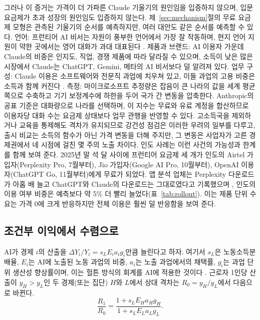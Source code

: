 \documentclass[11pt]{article}
\theoremstyle{definition}
\theoremstyle{remark}
\begin{document}
그러나 이 증거는 가격이 더 가파른 Claude 기울기의 원인임을 입증하지 않으며, 입문 요금제가 초과 성장의 원인임도 입증하지 않는다. 제~\ref{sec:mechanism}절의 무료 요금제 모형은 관측된 기울기의 순서를 예측하지만, 여러 대안도 같은 순서를 예측할 수 있다. 언어: 프런티어 AI 비서는 자원이 풍부한 언어에서 가장 잘 작동하며, 현지 언어 지원이 약한 곳에서는 영어 대화가 과대 대표된다 \citep{daepp2026how}. 제품과 브랜드: AI 이용자 가운데 Claude의 비중은 인지도, 직업, 경쟁 제품에 따라 달라질 수 있으며, 소득이 낮은 많은 시장에서 Claude는 ChatGPT, Gemini, 메타의 AI 비서보다 덜 알려져 있다. 업무 구성: Claude 이용은 소프트웨어와 전문직 과업에 치우쳐 있고, 이들 과업의 고용 비중은 소득과 함께 커진다 \citep{gmyrek2025generative}. 측정: 마이크로소프트 추정량은 잡음이 큰 나라의 값을 세계 평균 쪽으로 수축하고 기기 보정계수에 하한을 두어 국가 간 변동을 압축한다. Anthropic의 공표 기준은 대화량으로 나라를 선택하며, 이 지수는 무료와 유료 계정을 합산하므로 이용자당 대화 수는 요금제 상태보다 업무 관행을 반영할 수 있다. 고소득국을 제외하거나 교육을 통제해도 격차가 유지되므로 강건성 점검은 이러한 우려의 일부를 다루고, 출시 비교는 소득의 함수가 아닌 가격 변동을 더해 주지만, 그 변동은 사업자가 고른 경제권에서 네 시점에 걸친 몇 주의 노출 차이다. 인도 사례는 이런 사건의 가능성과 한계를 함께 보여 준다. 2025년 말 석 달 사이에 프런티어 요금제 세 개가 인도의 Airtel 가입자(Perplexity Pro, 7월부터), Jio 가입자(Google AI Pro, 10월부터), OpenAI 이용자(ChatGPT Go, 11월부터)에게 무료가 되었다. 앱 분석 업체는 Perplexity 다운로드가 아홉 배 늘고 ChatGPT와 Claude의 다운로드는 그대로였다고 기록했으며 \citep{techcrunch2026perplexity}, 인도의 이용 여부 비중은 예측보다 약 5\% 더 빨리 늘었다(표~\ref{tab:rollout}). 이는 제품 단위 수요는 가격 0에 크게 반응하지만 전체 이용은 훨씬 덜 반응함을 보여 준다.

\subsection{조건부 이익에서 수렴으로}\label{sec:equal}

AI가 경제 $i$의 산출을 $\Delta Y_i/Y_i = s_L E_i a_i g_i$만큼 늘린다고 하자. 여기서 $s_L$은 노동소득분배율, $E_i$는 AI에 노출된 노동 과업의 비중, $a_i$는 노출 과업에서의 채택률, $g_i$는 과업 단위 생산성 향상률이며, 이는 헐튼 방식의 회계를 AI에 적용한 것이다 \citep{hulten1978growth,acemoglu2019automation,acemoglu2025simple}. 근로자 1인당 산출이 $y_H>y_L$인 두 경제(또는 집단) $H$와 $L$에서 상대 격차는 $R_0=y_H/y_L$에서 다음으로 바뀐다.
\begin{equation}
\frac{R_1}{R_0} = \frac{1 + s_L E_H a_H g_H}{1 + s_L E_L a_L g_L}.
\label{eq:ratio}
\end{equation}
\end{document}
